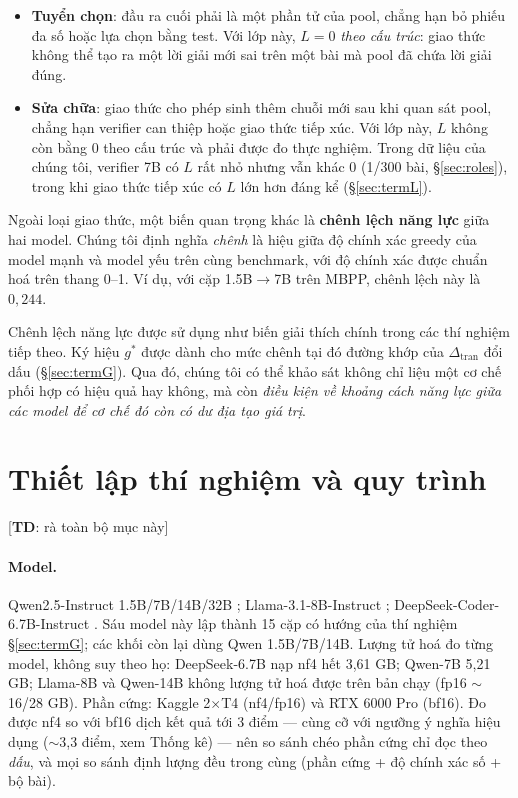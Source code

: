 \documentclass[12pt,a4paper]{article}
\newcommand{\todoTD}[1]{\textcolor{red!70!black}{[\textbf{TD}: #1]}}
\newcommand{\dceil}{\Delta_{\mathrm{tran}}}
\begin{document}
\begin{itemize}\itemsep1pt
\item \textbf{Tuyển chọn}: đầu ra cuối phải là một phần tử của pool, chẳng hạn bỏ phiếu đa số
      hoặc lựa chọn bằng test. Với lớp này, $L=0$ \emph{theo cấu trúc}: giao thức không thể tạo
      ra một lời giải mới sai trên một bài mà pool đã chứa lời giải đúng.
\item \textbf{Sửa chữa}: giao thức cho phép sinh thêm chuỗi mới sau khi quan sát pool, chẳng
      hạn verifier can thiệp hoặc giao thức tiếp xúc. Với lớp này, $L$ không còn bằng 0 theo
      cấu trúc và phải được đo thực nghiệm. Trong dữ liệu của chúng tôi, verifier 7B có $L$ rất
      nhỏ nhưng vẫn khác 0 (1/300 bài, \S\ref{sec:roles}), trong khi giao thức tiếp xúc có $L$
      lớn hơn đáng kể (\S\ref{sec:termL}).
\end{itemize}

Ngoài loại giao thức, một biến quan trọng khác là \textbf{chênh lệch năng lực} giữa hai model.
Chúng tôi định nghĩa \emph{chênh} là hiệu giữa độ chính xác greedy của model mạnh và model yếu
trên cùng benchmark, với độ chính xác được chuẩn hoá trên thang 0--1. Ví dụ, với cặp
1.5B$\to$7B trên MBPP, chênh lệch này là $0{,}244$.

Chênh lệch năng lực được sử dụng như biến giải thích chính trong các thí nghiệm tiếp theo. Ký
hiệu $g^\ast$ được dành cho mức chênh tại đó đường khớp của $\dceil$ đổi dấu
(\S\ref{sec:termG}). Qua đó, chúng tôi có thể khảo sát không chỉ liệu một cơ chế phối hợp có
hiệu quả hay không, mà còn \emph{điều kiện về khoảng cách năng lực giữa các model để cơ chế đó
còn có dư địa tạo giá trị}.


\section{Thiết lập thí nghiệm và quy trình}\label{sec:setup}

\todoTD{rà toàn bộ mục này}

\paragraph{Model.} Qwen2.5-Instruct 1.5B/7B/14B/32B \cite{yang2024}; Llama-3.1-8B-Instruct
\cite{grattafiori2024}; DeepSeek-Coder-6.7B-Instruct \cite{guo2024}. Sáu model này lập thành 15
cặp có hướng của thí nghiệm \S\ref{sec:termG}; các khối còn lại dùng Qwen 1.5B/7B/14B. Lượng tử
hoá đo từng model, không suy theo họ: DeepSeek-6.7B nạp nf4 hết 3,61 GB; Qwen-7B 5,21 GB;
Llama-8B và Qwen-14B không lượng tử hoá được trên bản chạy (fp16 $\sim$16/28 GB). Phần cứng:
Kaggle 2$\times$T4 (nf4/fp16) và RTX 6000 Pro (bf16). Đo được nf4 so với bf16 dịch kết quả tới
3 điểm --- cùng cỡ với ngưỡng ý nghĩa hiệu dụng ($\sim$3,3 điểm, xem Thống kê) --- nên so sánh
chéo phần cứng chỉ đọc theo \emph{dấu}, và mọi so sánh định lượng đều trong cùng (phần cứng +
độ chính xác số + bộ bài).
\end{document}
